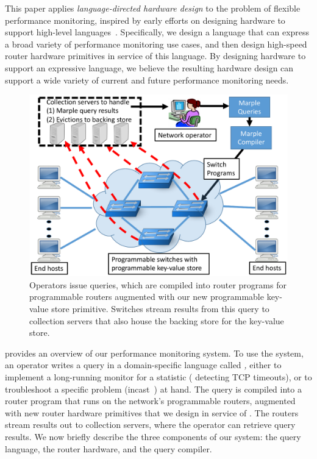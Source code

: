 This paper applies {\em language-directed hardware design} to the problem of
flexible performance monitoring, inspired by early efforts on designing
hardware to support high-level
languages~\cite{language-directed-computer-design, ditzel_patterson, soar}.
Specifically, we design a language that can express a broad variety of
performance monitoring use cases, and then design high-speed router hardware
primitives in service of this language. By designing hardware to support an
expressive language, we believe the resulting hardware design can support a
wide variety of current and future performance monitoring needs.

\begin{figure}[!t]
\includegraphics[width=\columnwidth]{pq_overview.pdf}
\caption{Operators issue \TheSystem queries, which are compiled into router
programs for programmable routers augmented with our new programmable
key-value store primitive. Switches stream results from this query to
collection servers that also house the backing store for the key-value store.}
\label{fig:overview}
\end{figure}

 provides an overview of our performance monitoring system. To
use the system, an operator writes a query in a domain-specific language called
{\em \TheSystem,} either to implement a long-running monitor for a statistic (\eg
detecting TCP timeouts), or to troubleshoot a specific problem (\eg incast~\cite{tcpincast}) at hand. The
query is compiled into a router program that runs on the network's programmable
routers, augmented with new router hardware primitives that we design in
service of \TheSystem.  The routers stream results out to collection servers,
where the operator can retrieve query results. We now briefly describe the
three components of our system: the query language, the router hardware, and
the query compiler.

